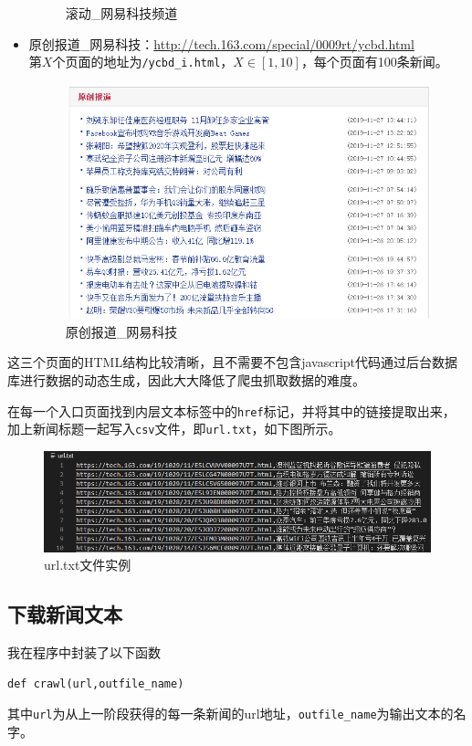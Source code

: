 \documentclass[logo,reportComp]{thesis}
\begin{document}
\begin{itemize}
\begin{figure}[H]
        \caption{滚动\_网易科技频道}
    \end{figure}
    \item 原创报道\_网易科技：\url{http://tech.163.com/special/0009rt/ycbd.html}\\
    第$X$个页面的地址为\verb'/ycbd_i.html'，$X\in[1,10]$，每个页面有100条新闻。
    \begin{figure}[H]
        \centering
        \includegraphics[width=0.8\linewidth]{fig/ycbd_netease.png}
        \caption{原创报道\_网易科技}
    \end{figure}
\end{itemize}
这三个页面的HTML结构比较清晰，且不需要不包含javascript代码通过后台数据库进行数据的动态生成，因此大大降低了爬虫抓取数据的难度。

在每一个入口页面找到内层文本标签中的\verb'href'标记，并将其中的链接提取出来，加上新闻标题一起写入\verb'csv'文件，即\verb'url.txt'，如下图所示。
\begin{figure}[H]
\centering
\includegraphics[width=\linewidth]{fig/url.png}
\caption{url.txt文件实例}
\end{figure}

\subsection{下载新闻文本}
我在程序中封装了以下函数
\begin{lstlisting}
def crawl(url,outfile_name)
\end{lstlisting}
其中\verb'url'为从上一阶段获得的每一条新闻的url地址，\verb'outfile_name'为输出文本的名字。
\end{document}
